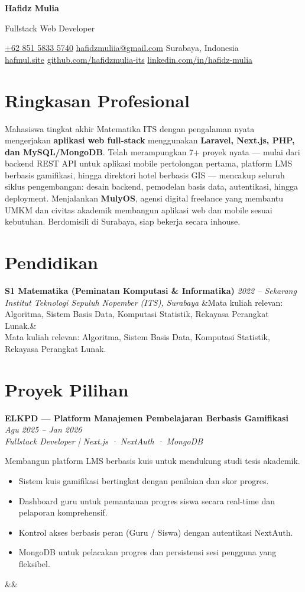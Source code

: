 \documentclass[a4paper,11pt]{article}
\newcommand{\cvname}[1]{%
  {\centering\LARGE\bfseries #1\par\vspace{2pt}}%
}
\newcommand{\cvtitle}[1]{%
  {\centering\large\color{accent} #1\par\vspace{4pt}}%
}
\newcommand{\cvcontact}[1]{%
  {\centering\small #1\par\vspace{6pt}}%
}
\newcommand{\cventry}[4]{%
  \noindent\textbf{#1} \hfill \textit{#3} \\
  \textit{#2}
  \ifx&#4& \else \\ \small #4 \fi
  \vspace{6pt}
}
\newcommand{\cvproject}[5]{%
  \noindent\textbf{#1} \hfill \textit{#2} \\
  \textit{\small #3} \\
  {\small #4}
  \ifx&#5& \else \par\noindent{\small \href{#5}{Lihat Repositori / Demo}} \fi
  \vspace{6pt}
}
\begin{document}
\cvname{Hafidz Mulia}
\cvtitle{Fullstack Web Developer}
\cvcontact{%
  \href{tel:+6285158335740}{+62 851 5833 5740} \quad\textbar\quad
  \href{mailto:hafidzmuliia@gmail.com}{hafidzmuliia@gmail.com} \quad\textbar\quad
  Surabaya, Indonesia \\
  \href{https://hafmul.site}{hafmul.site} \quad\textbar\quad
  \href{https://github.com/hafidzmulia-its}{github.com/hafidzmulia-its} \quad\textbar\quad
  \href{https://linkedin.com/in/hafidz-mulia}{linkedin.com/in/hafidz-mulia}
}

\section{Ringkasan Profesional}
Mahasiswa tingkat akhir Matematika ITS dengan pengalaman nyata mengerjakan \textbf{aplikasi web full-stack} menggunakan \textbf{Laravel, Next.js, PHP, dan MySQL/MongoDB}. Telah merampungkan 7+ proyek nyata --- mulai dari backend REST API untuk aplikasi mobile pertolongan pertama, platform LMS berbasis gamifikasi, hingga direktori hotel berbasis GIS --- mencakup seluruh siklus pengembangan: desain backend, pemodelan basis data, autentikasi, hingga deployment. Menjalankan \textbf{MulyOS}, agensi digital freelance yang membantu UMKM dan civitas akademik membangun aplikasi web dan mobile sesuai kebutuhan. Berdomisili di Surabaya, siap bekerja secara inhouse.

\section{Pendidikan}
\cventry
  {S1 Matematika (Peminatan Komputasi \& Informatika)}
  {Institut Teknologi Sepuluh Nopember (ITS), Surabaya}
  {2022 -- Sekarang}
  {Mata kuliah relevan: Algoritma, Sistem Basis Data, Komputasi Statistik, Rekayasa Perangkat Lunak.}

\section{Proyek Pilihan}

\cvproject
  {ELKPD --- Platform Manajemen Pembelajaran Berbasis Gamifikasi}
  {Agu 2025 -- Jan 2026}
  {Fullstack Developer | Next.js · NextAuth · MongoDB}
  {Membangun platform LMS berbasis kuis untuk mendukung studi tesis akademik.
  \begin{itemize}[leftmargin=15pt, nosep]
      \item Sistem kuis gamifikasi bertingkat dengan penilaian dan skor progres.
      \item Dashboard guru untuk pemantauan progres siswa secara real-time dan pelaporan komprehensif.
      \item Kontrol akses berbasis peran (Guru / Siswa) dengan autentikasi NextAuth.
      \item MongoDB untuk pelacakan progres dan persistensi sesi pengguna yang fleksibel.
  \end{itemize}}
  {}
\end{document}
